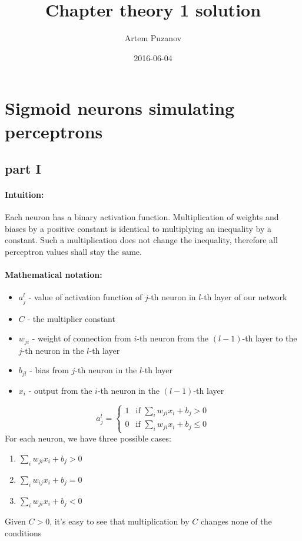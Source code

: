 \documentclass{article}
\title{Chapter theory 1 solution}
\date{2016-06-04}
\author{Artem Puzanov}
\begin{document}
\maketitle
{}
\newpage
{}

\section{Sigmoid neurons simulating perceptrons}
\subsection{part I}
\paragraph{Intuition:} 
Each neuron has a binary activation function. Multiplication of weights and biases 
by a positive constant is identical to multiplying an inequality by a constant. 
Such a multiplication does not change the inequality, therefore all perceptron values shall stay the same.
\paragraph{Mathematical notation:} 
\begin{itemize}
\item $a_{j}^l$ - value of activation function of $j$-th neuron in $l$-th layer of our network
\item $C$ -  the multiplier constant
\item $w_{ji}$ - weight of connection from $i$-th neuron from the $(l-1)$-th layer to the $j$-th neuron in the $l$-th layer 
\item $b_{jl}$ - bias from $j$-th neuron in the $l$-th layer
\item $x_i$ - output from the $i$-th neuron in the $(l-1)$-th layer
\end{itemize}
\[
a_{j}^l = 
\begin{cases}
1 & \text{if } \sum_{i}w_{ji}x_i + b_j > 0 \\
0 & \text{if } \sum_{i}w_{ji}x_i + b_j \leq 0
\end{cases}
\]
For each neuron, we have three possible cases:
\begin{enumerate}
\item $\sum_{i}w_{ji}x_i + b_j > 0$
\item $\sum_{i}w_{ij}x_i + b_j = 0$
\item $\sum_{i}w_{ji}x_i + b_j < 0$
\end{enumerate}
Given $C > 0$, it's easy to see that multiplication by $C$ changes none of the conditions
\end{document}
